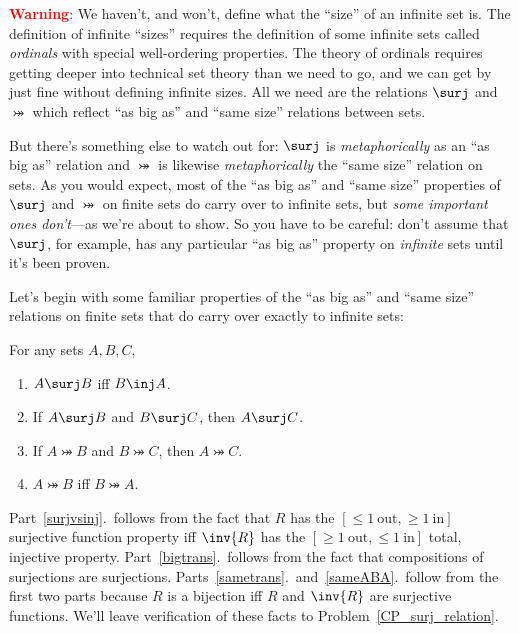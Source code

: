 \textbf{\textcolor{red}{Warning}}: We haven't, and won't, define what
the ``size'' of an infinite set is.  The definition of infinite
``sizes'' requires the definition of some infinite sets called
\emph{ordinals} with special well-ordering properties.  The theory of
ordinals requires getting deeper into technical set theory than we
need to go, and we can get by just fine without defining infinite
sizes.  All we need are the relations $\surj$ and $\bij$ which reflect
``as big as'' and ``same size'' relations between sets.

But there's something else to watch out for: $\surj$ is
\emph{metaphorically} as an ``as big as'' relation and $\bij$ is
likewise \emph{metaphorically} the ``same size'' relation on sets.  As
you would expect, most of the ``as big as'' and ``same size''
properties of $\surj$ and $\bij$ on finite sets do carry over to
infinite sets, but \emph{some important ones don't}---as we're about
to show.  So you have to be careful: don't assume that $\surj$, for
example, has any particular ``as big as'' property on \emph{infinite}
sets until it's been proven.

Let's begin with some familiar properties of the ``as big as'' and
``same size'' relations on finite sets that do carry over exactly to
infinite sets:
\begin{lemma}\label{surjinjbij_properties}
For any sets $A,B,C$,
\begin{enumerate}

\item \label{surjvsinj} $A \surj B$ iff $B \inj A$.

\item \label{bigtrans} If $A \surj B$ and $B \surj C$, then $A \surj
  C$.

\item \label{sametrans} If $A \bij B$ and $B \bij C$, then $A \bij C$.

\item\label{sameABA} $A \bij B$ iff $B \bij A$.
\end{enumerate}
\end{lemma}

Part~\ref{surjvsinj}.\ follows from the fact that $R$ has the $[\le
  1\ \text{out}, \ge 1\ \text{in}]$ surjective function property iff
$\inv{R}$ has the $[\ge 1\ \text{out}, \le 1\ \text{in}]$ total,
injective property.  Part~\ref{bigtrans}.\ follows from the fact that
compositions of surjections are surjections.
Parts~\ref{sametrans}.\ and~\ref{sameABA}.\ follow from the first two
parts because $R$ is a bijection iff $R$ and $\inv{R}$ are surjective
functions.  We'll leave verification of these facts to
Problem~\ref{CP_surj_relation}.

